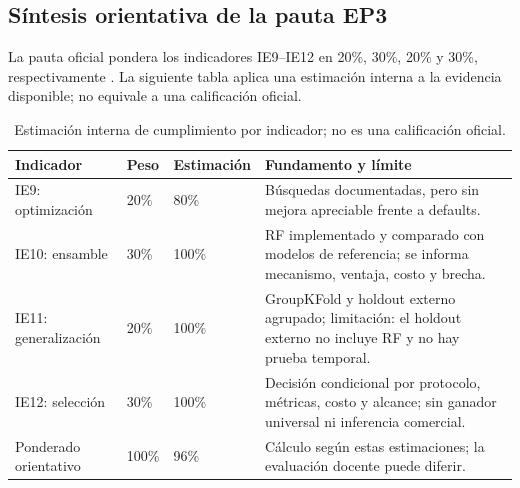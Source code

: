 \subsection{Síntesis orientativa de la pauta EP3}

La pauta oficial pondera los indicadores IE9--IE12 en 20\%, 30\%, 20\% y 30\%, respectivamente
\citep{duoc_ep3_rubric}. La siguiente tabla aplica una estimación interna a la evidencia disponible;
no equivale a una calificación oficial.

\begin{table}[H]
\centering
\caption{Estimación interna de cumplimiento por indicador; no es una calificación oficial.}
\begin{tabularx}{\textwidth}{p{2.4cm}p{1.2cm}p{2.2cm}X}
\toprule
Indicador & Peso & Estimación & Fundamento y límite \\
\midrule
IE9: optimización & 20\% & 80\% & Búsquedas documentadas, pero sin mejora apreciable frente a defaults. \\
IE10: ensamble & 30\% & 100\% & RF implementado y comparado con modelos de referencia; se informa mecanismo, ventaja, costo y brecha. \\
IE11: generalización & 20\% & 100\% & GroupKFold y holdout externo agrupado; limitación: el holdout externo no incluye RF y no hay prueba temporal. \\
IE12: selección & 30\% & 100\% & Decisión condicional por protocolo, métricas, costo y alcance; sin ganador universal ni inferencia comercial. \\
\midrule
Ponderado orientativo & 100\% & 96\% & Cálculo según estas estimaciones; la evaluación docente puede diferir. \\
\bottomrule
\end{tabularx}
\end{table}
